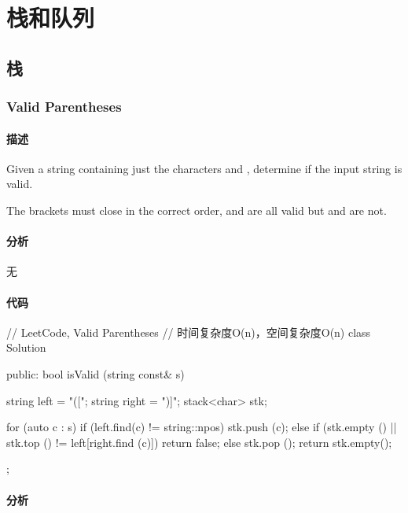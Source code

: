 \chapter{栈和队列}


\section{栈} %


\subsection{Valid Parentheses} %
\label{sec:valid-parentheses}


\subsubsection{描述}
Given a string containing just the characters \code{'(', ')', '\{', '\}', '['} and \code{']'}, determine if the input string is valid.

The brackets must close in the correct order,  and  are all valid but \code{"(]"} and  are not.


\subsubsection{分析}
无


\subsubsection{代码}
\begin{Code}
// LeetCode, Valid Parentheses
// 时间复杂度O(n)，空间复杂度O(n)
class Solution {
public:
    bool isValid (string const& s) {
        string left = "([{";
        string right = ")]}";
        stack<char> stk;

        for (auto c : s) {
            if (left.find(c) != string::npos) {
                stk.push (c);
            } else {
                if (stk.empty () || stk.top () != left[right.find (c)])
                    return false;
                else
                    stk.pop ();
            }
        }
        return stk.empty();
    }
};
\end{Code}

\subsubsection{分析}


